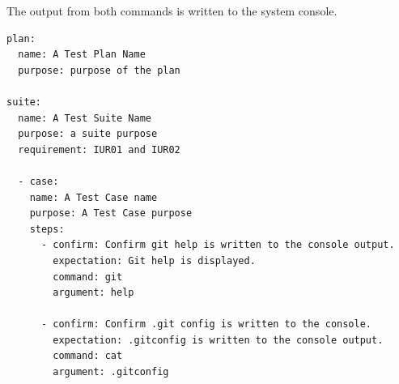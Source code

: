 The output from both commands is written to the system console.

\begin{lstlisting}
plan:
  name: A Test Plan Name
  purpose: purpose of the plan

suite:
  name: A Test Suite Name
  purpose: a suite purpose
  requirement: IUR01 and IUR02

  - case:
    name: A Test Case name
    purpose: A Test Case purpose
    steps:
      - confirm: Confirm git help is written to the console output.
        expectation: Git help is displayed.
        command: git
        argument: help

      - confirm: Confirm .git config is written to the console.
        expectation: .gitconfig is written to the console output.
        command: cat
        argument: .gitconfig
\end{lstlisting}
